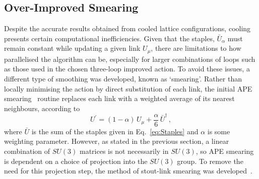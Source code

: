 \subsection{Over-Improved Smearing}
Despite the accurate results obtained from cooled lattice configurations, cooling presents certain computational inefficiencies. Given that the staples, $\bar{U}_\alpha$ must remain constant while updating a given link $U_\mu$, there are limitations to how  parallelised the algorithm can be, especially for larger combinations of loops such as those used in the chosen three-loop improved action. To avoid these issues, a different type of smoothing was developed, known as `smearing'. Rather than locally minimising the action by direct substitution of each link, the initial APE smearing~\cite{Albanese:1987ds, Falcioni:1984ei} routine replaces each link with a weighted average of its nearest neighbours, according to
%
\begin{equation}
U^\prime = (1-\alpha)\,U_\mu + \frac{\alpha}{6}\,\bar{U}^\dagger\, ,
\end{equation}
%
where $\bar{U}$ is the sum of the staples given in Eq.~\ref{eq:Staples} and $\alpha$ is some weighting parameter. However, as stated in the previous section, a linear combination of $SU(3)$ matrices is not necessarily in $SU(3)$, so APE smearing is dependent on a choice of projection into the $SU(3)$ group. To remove the need for this projection step, the method of stout-link smearing was developed~\cite{Morningstar:2003gk}.\\

